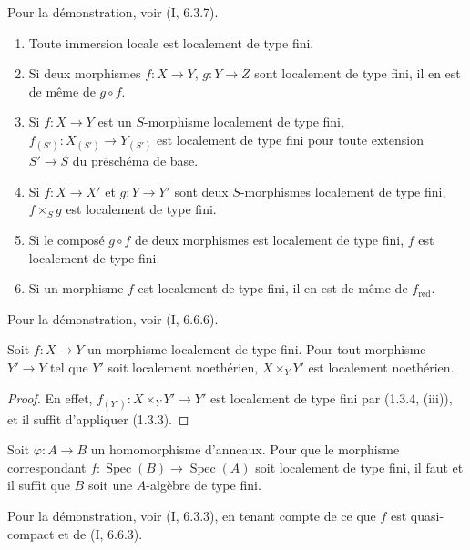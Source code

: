 Pour la démonstration, voir (I, 6.3.7).

\begin{proposition}[1.3.4]
\label{IV.1.3.4-fr}
\begin{enumerate}
  \item[(i)] Toute immersion locale est localement de type fini.
  \item[(ii)] Si deux morphismes $f:X\to Y$, $g:Y\to Z$ sont localement de
  type fini, il en est de même de $g\circ f$.
  \item[(iii)] Si $f:X\to Y$ est un $S$-morphisme localement de type fini,
  $f_{(S')}:X_{(S')}\to Y_{(S')}$ est localement de type fini pour toute
  extension $S'\to S$ du préschéma de base.
  \item[(iv)] Si $f:X\to X'$ et $g:Y\to Y'$ sont deux $S$-morphismes
  localement de type fini, $f\times_Sg$ est localement de type fini.
  \item[(v)] Si le composé $g\circ f$ de deux morphismes est localement de
  type fini, $f$ est localement de type fini.
  \item[(vi)] Si un morphisme $f$ est localement de type fini, il en est de
  même de $f_{\mathrm{red}}$.
\end{enumerate}
\end{proposition}

Pour la démonstration, voir (I, 6.6.6).

\begin{corollary}[1.3.5]
\label{IV.1.3.5-fr}
Soit $f:X\to Y$ un morphisme localement de type fini. Pour tout morphisme
$Y'\to Y$ tel que $Y'$ soit localement noethérien, $X\times_YY'$ est
localement noethérien.
\end{corollary}

\begin{proof}
En effet, $f_{(Y')}:X\times_YY'\to Y'$ est localement de type fini par
(1.3.4, (iii)), et il suffit d'appliquer (1.3.3).
\end{proof}

\begin{proposition}[1.3.6]
\label{IV.1.3.6-fr}
Soit $\varphi:A\to B$ un homomorphisme d'anneaux. Pour que le morphisme
correspondant $f:\operatorname{Spec}(B)\to\operatorname{Spec}(A)$ soit localement de type fini, il faut et
il suffit que $B$ soit une $A$-algèbre de type fini.
\end{proposition}

Pour la démonstration, voir (I, 6.3.3), en tenant compte de ce que $f$ est
quasi-compact et de (I, 6.6.3).

